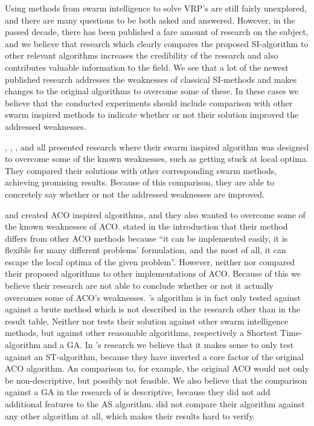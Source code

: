Using methods from swarm intelligence to solve VRP's are still fairly unexplored, and there are many questions to be both asked and answered. However, in the passed decade, there has been published a fare amount of research on the subject, and we believe that research which clearly compares the proposed SI-algorithm to other relevant algorithms increases the credibility of the research and also contributes valuable information to the field. We see that a lot of the newest published research addresses the weaknesses of classical SI-methods and makes changes to the original algorithms to overcome some of these. In these cases we believe that the conducted experiments should include comparison with other swarm inspired methods to indicate whether or not their solution improved the addressed weaknesses. 

\citet{tripathi09}, \citet{yang07}, \citet{salehinejad10}, and \citet{jiang10} all presented research where their swarm inspired algorithm was designed to overcome some of the known weaknesses, such as getting stuck at local optima. They compared their solutions with other corresponding swarm methods, achieving promising results. Because of this comparison, they are able to concretely say whether or not the addressed weaknesses are improved. 

\citet{hsiao04} and \citet{sedighpour14} created ACO inspired algorithms, and they also wanted to overcome some of the known weaknesses of ACO. \citet{hsiao04} stated in the introduction that their method differs from other ACO methods because ``it can be implemented easily, it is flexible for many different problems' formulation, and the most of all, it can escape the local optima of the given problem''. However, neither \citet{hsiao04} nor \citet{sedighpour14} compared their proposed algorithms to other implementations of ACO. Because of this we believe their research are not able to conclude whether or not it actually overcomes some of ACO's weaknesses. \citet{hsiao04}'s algorithm is in fact only tested against against a brute method which is not described in the research other than in the result table. Neither \citet{dias14} nor \citet{poorzahedy11} tests their solution against other swarm intelligence methods, but against other reasonable algorithms, respectively a Shortest Time-algorithm and a GA. In \citet{dias14}'s research we believe that it makes sense to only test against an ST-algorithm, because they have inverted a core factor of the original ACO algorithm. An comparison to, for example, the original ACO would not only be non-descriptive, but possibly not feasible. We also believe that the comparison against a GA in the research of \citet{poorzahedy11} is descriptive, because they did not add additional features to the AS algorithm.\citet{salehi-nezhad07} did not compare their algorithm against any other algorithm at all, which makes their results hard to verify. \newline

